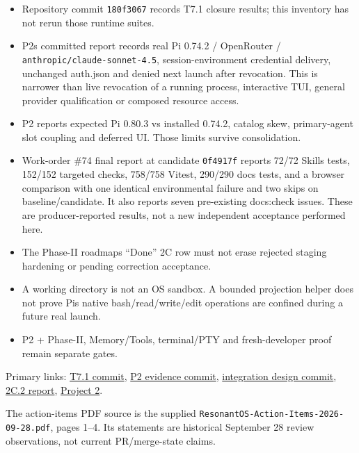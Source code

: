 \documentclass[
  10pt,
]{article}
\providecommand{\tightlist}{%
  \setlength{\itemsep}{0pt}\setlength{\parskip}{0pt}}
\begin{document}
\begin{itemize}
\tightlist
\item
  Repository commit \nolinkurl{180f3067} records T7.1 closure results; this
  inventory has not rerun those runtime suites.
\item
  P2\textquotesingle s committed report records real Pi 0.74.2 /
  OpenRouter / \nolinkurl{anthropic/claude-sonnet-4.5}, session-environment
  credential delivery, unchanged auth.json and denied next launch after
  revocation. This is narrower than live revocation of a running
  process, interactive TUI, general provider qualification or composed
  resource access.
\item
  P2 reports expected Pi 0.80.3 vs installed 0.74.2, catalog skew,
  primary-agent slot coupling and deferred UI. Those limits survive
  consolidation.
\item
  Work-order \#74 final report at candidate \nolinkurl{0f4917f} reports
  72/72 Skills tests, 152/152 targeted checks, 758/758 Vitest, 290/290
  docs tests, and a browser comparison with one identical environmental
  failure and two skips on baseline/candidate. It also reports seven
  pre-existing docs:check issues. These are producer-reported results,
  not a new independent acceptance performed here.
\item
  The Phase-II roadmap\textquotesingle s ``Done'' 2C row must not erase
  rejected staging hardening or pending correction acceptance.
\item
  A working directory is not an OS sandbox. A bounded projection helper
  does not prove Pi\textquotesingle s native bash/read/write/edit
  operations are confined during a future real launch.
\item
  P2 + Phase-II, Memory/Tools, terminal/PTY and fresh-developer proof
  remain separate gates.
\end{itemize}

Primary links:
\href{https://github.com/vonstegen/2.0.0-alpha/commit/180f3067906d4782df5b923ca46ef77b80828333}{T7.1
commit},
\href{https://github.com/vonstegen/2.0.0-alpha/commit/5ac7c248ed85cd07ff02c882f09d45ccb9cbcd99}{P2
evidence commit},
\href{https://github.com/vonstegen/2.0.0-alpha/commit/297e64ad4946bd44f4497c5dfedc11c58a8b1314}{integration
design commit},
\href{https://github.com/vonstegen/vigil-mcp-work-orders-test/issues/74\#issuecomment-5901163827}{2C.2
report}, \href{https://github.com/orgs/ResonantOS/projects/2}{Project
2}.

The action-items PDF source is the supplied
\nolinkurl{ResonantOS-Action-Items-2026-09-28.pdf}, pages 1--4. Its
statements are historical September 28 review observations, not current
PR/merge-state claims.
\end{document}
